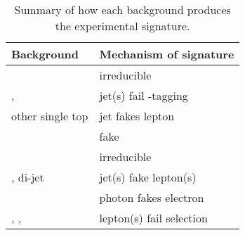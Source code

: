 \begin{table}
	\begin{tabular}{l@{\hskip 0.3in}l}
		\toprule
		Background        & Mechanism of \HepProcess{\Plepton\Plepton + \met} signature \\
		\midrule
		\WW               & irreducible \\
		\ttbar, \HepProcess{\PW \Ptop} & jet(s) fail \Pbottom-tagging \\
		other single top  & jet fakes lepton \\
		\DYll             & fake \met \\
		\DYtt             & irreducible \\
		\Wjets, di-jet    & jet(s) fake lepton(s) \\
		\Wgamma           & photon fakes electron \\
		\WZ, \Wgstar, \ZZ & lepton(s) fail selection \\
		\bottomrule
	\end{tabular}
	\caption{Summary of how each background produces the 
	\HepProcess{\Plepton\Plepton + \met} experimental signature.}
	\label{tab:bkg_summary}
\end{table}

